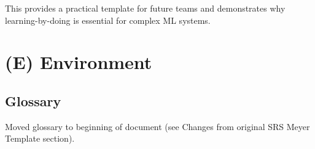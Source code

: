 \documentclass{article}
\begin{document}
This provides a practical template for future teams and demonstrates why learning-by-doing is essential for complex ML systems.


\newpage{}


\section*{(E) Environment}\label{sec:srs-environment}
\renewcommand{\thesubsection}{E.\arabic{subsection}}
\renewcommand{\theHsubsection}{E.\arabic{subsection}}
\setcounter{subsection}{0}

\subsection{Glossary}\label{subsec:glossary}
\raggedright Moved glossary to beginning of document (see Changes from original SRS Meyer Template section).
\end{document}
